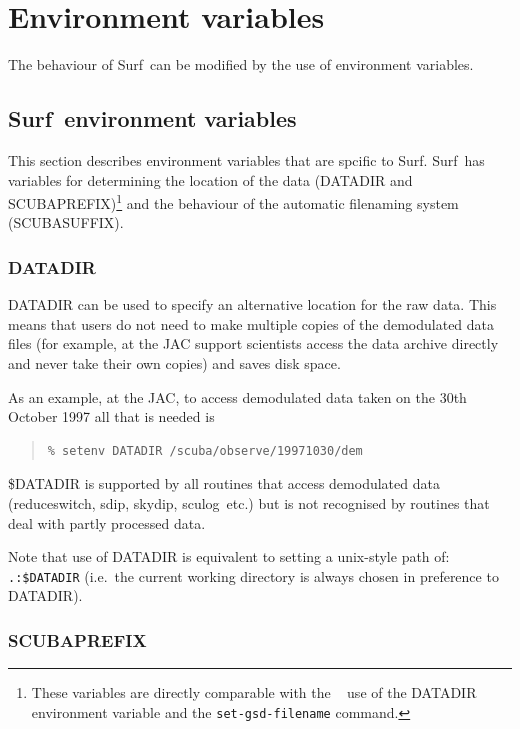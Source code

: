 \documentclass[twoside,11pt]{article}
\newcommand{\scusoft}          {{\sc Surf}}
\newcommand{\specx}{\xref{{\sc{Specx}}}{sc8}{}}
\newcommand{\task}[1]{{\sf #1}}
\newcommand{\resw}{\htmlref{\task{reduce\_switch}}{REDUCE_SWITCH}}
\newcommand{\skydip}{\htmlref{\task{skydip}}{SKYDIP}}
\newcommand{\sculog}{\htmlref{\task{sculog}}{SCULOG}}
\newcommand{\sdip}{\htmlref{\task{sdip}}{SDIP}}
\newenvironment{myquote}{\begin{quote}\begin{small}}{\end{small}\end{quote}}
\newcommand{\htmlref}[2]{#1}
\newcommand{\xref}[3]{#1}
\newcommand{\xlabel}[1]{}
\renewcommand{\_}{\texttt{\symbol{95}}}
\begin{document}
\section{\xlabel{env}Environment variables\label{env}}

The behaviour of \scusoft\ can be modified by the use of environment
variables. 

\subsection{\scusoft\ environment variables}

This section describes environment variables that are spcific to \scusoft.
\scusoft\ has variables for determining the location of the data (DATADIR and
SCUBA\_PREFIX)\footnote{These variables are directly comparable with the
\specx\ \cite{specx} use of the DATADIR environment variable and the
\texttt{set-gsd-filename} command.} and the behaviour of the automatic
filenaming system (SCUBA\_SUFFIX). 

\subsubsection{DATADIR}

DATADIR can be used to specify an alternative location for the raw data.
This means that users do not need to make multiple copies of the demodulated
data files (for example, at the JAC support scientists access the data archive 
directly and never take their own copies) and saves disk space.

As an example, at the JAC, to access demodulated data taken on the 30th
October 1997 all that is needed is
\begin{myquote}
\begin{verbatim}
% setenv DATADIR /scuba/observe/19971030/dem
\end{verbatim}
\end{myquote}
\$DATADIR is supported by all routines that access demodulated data
(\resw, \sdip, \skydip, \sculog\ etc.) but is not recognised by routines that
deal with partly processed data.

Note that use of DATADIR is equivalent to setting a unix-style path of:
\verb+.:$DATADIR+ (i.e.\ the current working directory is always chosen in
preference to DATADIR).




\subsubsection{SCUBA\_PREFIX}
\end{document}
